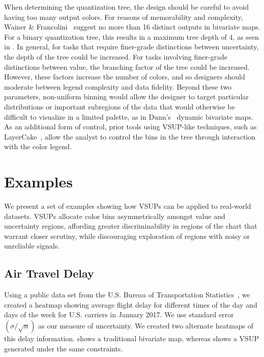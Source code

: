 When determining the quantization tree, the design should be careful to avoid having too many output colors. For reasons of memorability and complexity, Wainer \& Francolini~\cite{wainer1980empirical} suggest no more than 16 distinct outputs in bivariate maps. For a binary quantization tree, this results in a maximum tree depth of 4, as seen in . In general, for tasks that require finer-grade distinctions between uncertainty, the depth of the tree could be increased. For tasks involving finer-grade distinctions between value, the branching factor of the tree could be increased. However, these factors increase the number of colors, and so designers should moderate between legend complexity and data fidelity. Beyond these two parameters, non-uniform binning would allow the designer to target particular distributions or important subregions of the data that would otherwise be difficult to visualize in a limited palette, as in Dunn's~\cite{dunn1989dynamic} dynamic bivariate maps. As an additional form of control, prior tools using VSUP-like techniques, such as LayerCake~\cite{correll2015layercake}, allow the analyst to control the bins in the tree through interaction with the color legend.

\section{Examples}

We present a set of examples showing how VSUPs can be applied to real-world datasets. VSUPs allocate color bins asymmetrically amongst value and uncertainty regions, affording greater discriminability in regions of the chart that warrant closer scrutiny, while discouraging exploration of regions with noisy or unreliable signals.


\subsection{Air Travel Delay}

\airlineFig

Using a public data set from the U.S. Bureau of Transportation Statistics~\cite{bts}, we created a heatmap showing average flight delay for different times of the day and days of the week for U.S. carriers in January 2017. We use standard error $\left(\sigma / \sqrt{n}\right)$ as our measure of uncertainty. We created two alternate heatmaps of this delay information.  shows a traditional bivariate map, whereas  shows a VSUP generated under the same constraints.


